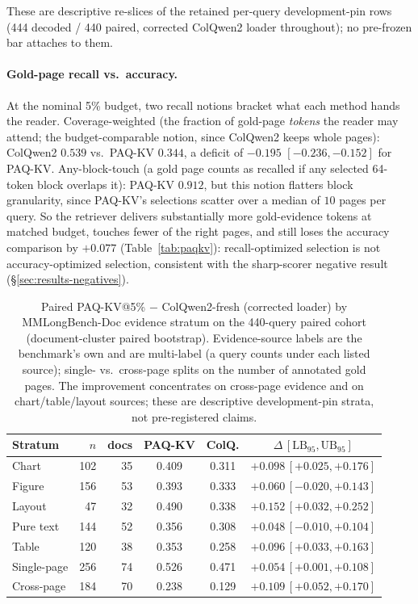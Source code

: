 \documentclass[letterpaper]{article} %
\newcommand{\paqc}{\textsc{PAQ-KV}}
\newcommand{\lb}{\mathrm{LB}_{95}}
\begin{document}
These are descriptive re-slices of the retained per-query development-pin rows (444 decoded / 440 paired, corrected ColQwen2 loader throughout); no pre-frozen bar attaches to them.

\paragraph{Gold-page recall vs.\ accuracy.} At the nominal 5\% budget, two recall notions bracket what each method hands the reader. Coverage-weighted (the fraction of gold-page \emph{tokens} the reader may attend; the budget-comparable notion, since ColQwen2 keeps whole pages): ColQwen2 $0.539$ vs.\ \paqc{} $0.344$, a deficit of $-0.195$ $[-0.236,-0.152]$ for \paqc{}. Any-block-touch (a gold page counts as recalled if any selected 64-token block overlaps it): \paqc{} $0.912$, but this notion flatters block granularity, since \paqc{}'s selections scatter over a median of $10$ pages per query. So the retriever delivers substantially more gold-evidence tokens at matched budget, touches fewer of the right pages, and still loses the accuracy comparison by $+0.077$ (Table~\ref{tab:paqkv}): recall-optimized selection is not accuracy-optimized selection, consistent with the sharp-scorer negative result (\S\ref{sec:results-negatives}).

\begin{table}[t]
\centering\small
\setlength{\tabcolsep}{1.3pt}%
\begin{tabular}{lrrccc}
\toprule
Stratum & $n$ & docs & \paqc{} & ColQ. & $\Delta\,[\lb,\mathrm{UB}_{95}]$ \\
\midrule
Chart       & 102 & 35 & 0.409 & 0.311 & $+0.098\,[+0.025,+0.176]$ \\
Figure      & 156 & 53 & 0.393 & 0.333 & $+0.060\,[-0.020,+0.143]$ \\
Layout      &  47 & 32 & 0.490 & 0.338 & $+0.152\,[+0.032,+0.252]$ \\
Pure text   & 144 & 52 & 0.356 & 0.308 & $+0.048\,[-0.010,+0.104]$ \\
Table       & 120 & 38 & 0.353 & 0.258 & $+0.096\,[+0.033,+0.163]$ \\
\midrule
Single-page & 256 & 74 & 0.526 & 0.471 & $+0.054\,[+0.001,+0.108]$ \\
Cross-page  & 184 & 70 & 0.238 & 0.129 & $+0.109\,[+0.052,+0.170]$ \\
\bottomrule
\end{tabular}
\caption{Paired \paqc{}@5\% $-$ ColQwen2-fresh (corrected loader) by MMLongBench-Doc evidence stratum on the 440-query paired cohort (document-cluster paired bootstrap). Evidence-source labels are the benchmark's own and are multi-label (a query counts under each listed source); single- vs.\ cross-page splits on the number of annotated gold pages. The improvement concentrates on cross-page evidence and on chart/table/layout sources; these are descriptive development-pin strata, not pre-registered claims.}
\label{tab:anatomy-strata}
\end{table}
\end{document}
